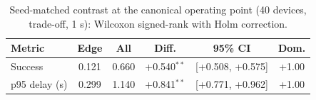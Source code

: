 \begin{table}[t]
\centering
\footnotesize
\caption{Seed-matched contrast at the canonical operating point (40 devices, trade-off, 1 s): Wilcoxon signed-rank with Holm correction.}
\label{tab:p1-paired}
\begin{tabular}{lccccc}
\toprule
Metric & Edge & All & Diff. & 95\% CI & Dom. \\
\midrule
Success & 0.121 & 0.660 & +0.540$^{**}$ & [+0.508, +0.575] & +1.00 \\
p95 delay (s) & 0.299 & 1.140 & +0.841$^{**}$ & [+0.771, +0.962] & +1.00 \\
\bottomrule
\end{tabular}
\par\vspace{2pt}{\footnotesize\raggedright Dominance is the share of seeds favouring ALL minus the share favouring EDGE\_ONLY; a zero difference has no test.\par}
\end{table}
